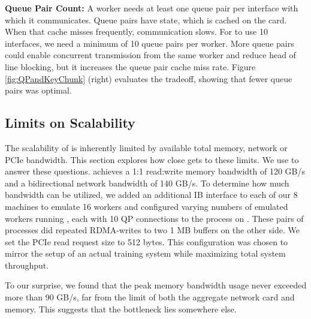\vspace{0.05in}
\noindent \textbf{Queue Pair Count:}
A worker needs at least one queue pair per interface with which it communicates. Queue pairs have state, which is cached on the card. When that cache misses frequently, communication slows. For \pbox to use 10 interfaces, we need a minimum of 10 queue pairs per worker. More queue pairs could enable concurrent transmission from the same worker and reduce head of line blocking, but it increases the queue pair cache miss rate. Figure \ref{fig:QPandKeyChunk} (right) evaluates the tradeoff, showing that fewer queue pairs was optimal.





\subsection{Limits on Scalability}
\label{sec:scability} 
The scalability of \phub is inherently limited by available total memory, network or PCIe bandwidth. This section explores how close \phub gets to these limits. We use \pbox to answer these questions. \pbox achieves a 1:1 read:write memory bandwidth of 120 GB/s and a bidirectional network bandwidth of 140 GB/s. To determine how much bandwidth can be utilized,
we added an additional IB interface to each of our 8 machines to emulate 16 workers and configured varying numbers of emulated workers running ,
each with 10 QP connections to the  process on \pbox. These pairs of processes did repeated RDMA-writes to two 1 MB buffers on the other side. We set the PCIe read request size to 512 bytes. This configuration was chosen to mirror the setup of an actual training system while maximizing total system throughput. 

To our surprise, we found that the peak memory bandwidth usage never exceeded more than 90 GB/s, far from the limit of both the aggregate network card and memory. This suggests that the bottleneck lies somewhere else. 

